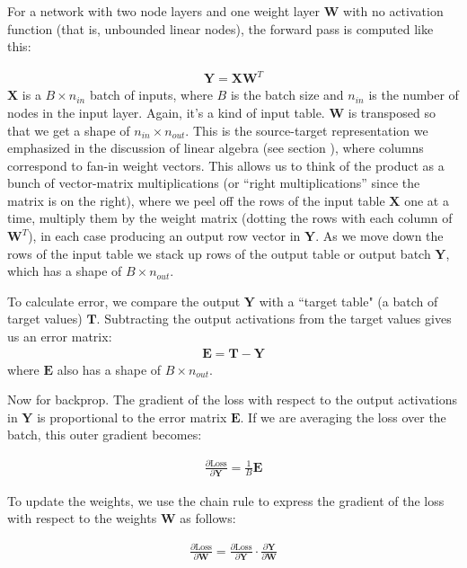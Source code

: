 
For a network with two node layers and one weight layer $\mathbf{W}$ with no activation function (that is, unbounded linear nodes), the forward pass is computed like this:

\begin{eqnarray}
\mathbf{Y} = \mathbf{X} \mathbf{W}^T
\end{eqnarray}
$\mathbf{X}$ is a  $B \times n_{in}$ batch of inputs, where $B$ is the batch size and $n_{in}$ is the number of nodes in the input layer. Again, it's a kind of input table. $\mathbf{W}$ is transposed so that we get a shape of $n_{in} \times n_{out}$. This is the source-target representation we emphasized in the discussion of linear algebra (see section ), where columns correspond to fan-in weight vectors. This allows us to think of the product as a bunch of vector-matrix multiplications (or ``right multiplications'' since the matrix is on the right), where we peel off the rows of the input table $\mathbf{X}$ one at a time, multiply them by the weight matrix (dotting the rows with each column of $\mathbf{W}^T$), in each case producing an output row vector in $\mathbf{Y}$. As we move down the rows of the input table we stack up rows of the output table or output batch $\mathbf{Y}$, which has a shape of $B \times n_{out}$.

To calculate error, we compare the output $\mathbf{Y}$ with a ``target table" (a batch of target values) $\mathbf{T}$. Subtracting the output activations from the target values  gives us an error matrix:
\begin{eqnarray}
\mathbf{E} = \mathbf{T} - \mathbf{Y}
\end{eqnarray}
where $\mathbf{E}$ also has a shape of $B \times n_{out}$.

Now for backprop. The gradient of the loss with respect to the output activations in $\mathbf{Y}$ is proportional to the error matrix $\mathbf{E}$. If we are averaging the loss over the batch, this outer gradient becomes:

\begin{eqnarray}
\frac{\partial \text{Loss}}{\partial \mathbf{Y}} = \frac{1}{B} \mathbf{E}
\end{eqnarray}

To update the weights, we use the chain rule to express the gradient of the loss with respect to the weights $\mathbf{W}$ as follows:

\begin{eqnarray}
\frac{\partial \text{Loss}}{\partial \mathbf{W}} = \frac{\partial \text{Loss}}{\partial \mathbf{Y}} \cdot \frac{\partial \mathbf{Y}}{\partial \mathbf{W}}
\end{eqnarray}

